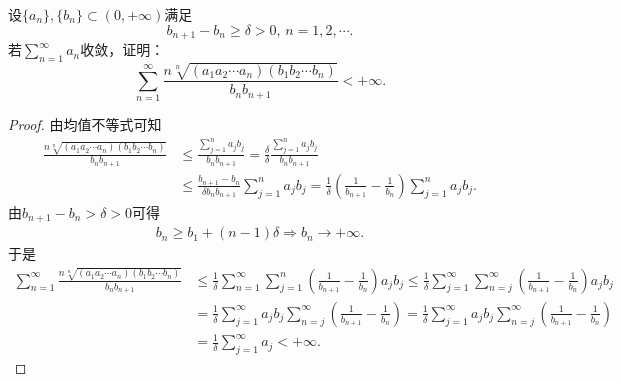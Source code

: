 \documentclass[../../main.tex]{subfiles}%
\begin{document}
\begin{example}
设$\{a_n\},\{b_n\} \subset (0,+\infty)$满足
\[ b_{n + 1} - b_n \geqslant \delta > 0, \, n = 1,2,\cdots. \]
若$\sum_{n = 1}^{\infty} a_n$收敛，证明：
\[ \sum_{n = 1}^{\infty} \frac{n\sqrt[n]{(a_1 a_2 \cdots a_n)(b_1 b_2 \cdots b_n)}}{b_n b_{n + 1}} < +\infty. \]
\end{example}
\begin{proof}
由均值不等式可知
\begin{align*}
\frac{n\sqrt[n]{(a_1a_2\cdots a_n)(b_1b_2\cdots b_n)}}{b_nb_{n+1}}&\leqslant \frac{\sum\limits_{j=1}^n{a_jb_j}}{b_nb_{n+1}}=\frac{\delta}{\delta}\frac{\sum\limits_{j=1}^n{a_jb_j}}{b_nb_{n+1}} \\
&\leqslant \frac{b_{n+1}-b_n}{\delta b_nb_{n+1}}\sum_{j=1}^n{a_jb_j}=\frac{1}{\delta}\left( \frac{1}{b_{n+1}}-\frac{1}{b_n} \right) \sum_{j=1}^n{a_jb_j}.
\end{align*}
由$b_{n+1}-b_n>\delta >0$可得
\begin{align*}
b_n\geqslant b_1+\left( n-1 \right) \delta \Longrightarrow b_n\rightarrow +\infty .
\end{align*}
于是
\begin{align*}
\sum_{n=1}^{\infty}{\frac{n\sqrt[n]{(a_1a_2\cdots a_n)(b_1b_2\cdots b_n)}}{b_nb_{n+1}}}&\leqslant \frac{1}{\delta}\sum_{n=1}^{\infty}{\sum_{j=1}^n{\left( \frac{1}{b_{n+1}}-\frac{1}{b_n} \right) a_jb_j}}\leqslant \frac{1}{\delta}\sum_{j=1}^{\infty}{\sum_{n=j}^{\infty}{\left( \frac{1}{b_{n+1}}-\frac{1}{b_n} \right) a_jb_j}}
\\
&=\frac{1}{\delta}\sum_{j=1}^{\infty}{a_jb_j\sum_{n=j}^{\infty}{\left( \frac{1}{b_{n+1}}-\frac{1}{b_n} \right)}}=\frac{1}{\delta}\sum_{j=1}^{\infty}{a_jb_j\sum_{n=j}^{\infty}{\left( \frac{1}{b_{n+1}}-\frac{1}{b_n} \right)}}
\\
&=\frac{1}{\delta}\sum_{j=1}^{\infty}{a_j}<+\infty .
\end{align*}
\end{proof}
\end{document}
